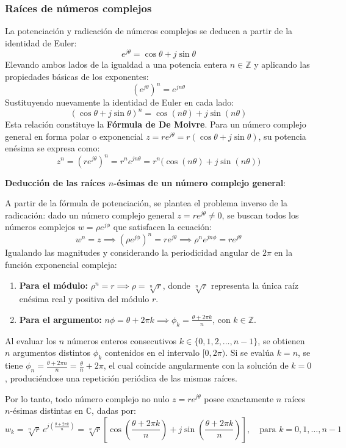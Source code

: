 \documentclass[11pt,a4paper]{article}
\begin{document}
\subsubsection{Raíces de números complejos}
La potenciación y radicación de números complejos se deducen a partir de la identidad de Euler:
\[
e^{j\theta} = \cos\theta + j\sin\theta
\]
Elevando ambos lados de la igualdad a una potencia entera $n \in \mathbb{Z}$ y aplicando las propiedades básicas de los exponentes:
\[
(e^{j\theta})^n = e^{jn\theta}
\]
Sustituyendo nuevamente la identidad de Euler en cada lado:
\[
(\cos\theta + j\sin\theta)^n = \cos(n\theta) + j\sin(n\theta)
\]
Esta relación constituye la \textbf{Fórmula de De Moivre}. Para un número complejo general en forma polar o exponencial $z = r e^{j\theta} = r(\cos\theta + j\sin\theta)$, su potencia enésima se expresa como:
\[
z^n = (r e^{j\theta})^n = r^n e^{jn\theta} = r^n \big(\cos(n\theta) + j\sin(n\theta)\big)
\]

\textbf{Deducción de las raíces $n$-ésimas de un número complejo general}:

A partir de la fórmula de potenciación, se plantea el problema inverso de la radicación: dado un número complejo general $z = r e^{j\theta} \neq 0$, se buscan todos los números complejos $w = \rho e^{j\phi}$ que satisfacen la ecuación:
\[
w^n = z \implies (\rho e^{j\phi})^n = r e^{j\theta} \implies \rho^n e^{jn\phi} = r e^{j\theta}
\]
Igualando las magnitudes y considerando la periodicidad angular de $2\pi$ en la función exponencial compleja:
\begin{enumerate}
    \item \textbf{Para el módulo:} $\rho^n = r \implies \rho = \sqrt[n]{r}$, donde $\sqrt[n]{r}$ representa la única raíz enésima real y positiva del módulo $r$.
    \item \textbf{Para el argumento:} $n\phi = \theta + 2\pi k \implies \phi_k = \frac{\theta + 2\pi k}{n}$, con $k \in \mathbb{Z}$.
\end{enumerate}

Al evaluar los $n$ números enteros consecutivos $k \in \{0, 1, 2, \dots, n-1\}$, se obtienen $n$ argumentos distintos $\phi_k$ contenidos en el intervalo $[0, 2\pi)$. Si se evalúa $k = n$, se tiene $\phi_n = \frac{\theta + 2\pi n}{n} = \frac{\theta}{n} + 2\pi$, el cual coincide angularmente con la solución de $k = 0$, produciéndose una repetición periódica de las mismas raíces.

Por lo tanto, todo número complejo no nulo $z = r e^{j\theta}$ posee exactamente $n$ raíces $n$-ésimas distintas en $\mathbb{C}$, dadas por:
\[
w_k = \sqrt[n]{r} \, e^{j\left(\frac{\theta + 2\pi k}{n}\right)} = \sqrt[n]{r} \left[\cos\left(\frac{\theta + 2\pi k}{n}\right) + j\sin\left(\frac{\theta + 2\pi k}{n}\right)\right], \quad \text{para } k = 0, 1, \dots, n-1
\]
\end{document}
